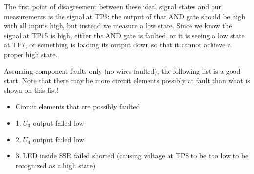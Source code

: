 
The first point of disagreement between these ideal signal states and our measurements is the signal at TP8: the output of that AND gate should be high with all inputs high, but instead we measure a low state.  Since we know the signal at TP15 is high, either the AND gate is faulted, or it is seeing a low state at TP7, or something is loading its output down so that it cannot achieve a proper high state.

\vskip 10pt

Assuming component faults only (no wires faulted), the following list is a good start.  Note that there may be more circuit elements possibly at fault than what is shown on this list!

\begin{itemize}
\item{} Circuit elements that are possibly faulted
\item{1.} $U_3$ output failed low
\item{2.} $U_4$ output failed low
\item{3.} LED inside SSR failed shorted (causing voltage at TP8 to be too low to be recognized as a high state)
\end{itemize}




